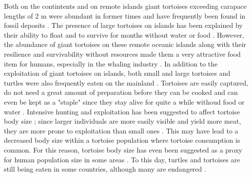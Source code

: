 Both on the contintents and on remote islands giant tortoises exceeding carapace lengths of 2 m were abundant in former times and have frequently been found in fossil deposits \citep{.}. The presence of large tortoises on islands has been explained by their ability to float and to survive for months without water or food \citep{Gerlach2006, Patterson1973, Cheke2016}. 
However, the abundance of giant tortoises on these remote oceanic islands along with their resilience and survivability without resources made them a very attractive food item for humans, especially in the whaling industry \citep{.}. 
In addition to the exploitation of giant tortoises on islands, both small and large tortoises and turtles were also frequently eaten on the mainland \citep{.}.
Tortoises are easily captured, do not need a great amount of preparation before they can be cooked and can even be kept as a "staple" since they stay alive for quite a while withoud food or water \citep{Thompson2002,Thompson2014}. Intensive hunting and exploitation has been suggested to affect tortoise body size \citep{.}; since larger individuals are more easily visible and yield more meat, they are more prone to exploitation than small ones \citep{Rhodin2015}. This may have lead to a decreased body size within a tortoise population where tortoise consumption is common.
For this reason, tortoise body size has even been suggested as a proxy for human population size in some areas \citep{Steele2005,Stiner1999,Stiner2000}.
To this day, turtles and tortoises are still being eaten in some countries, although many are endangered \citep{.}.

